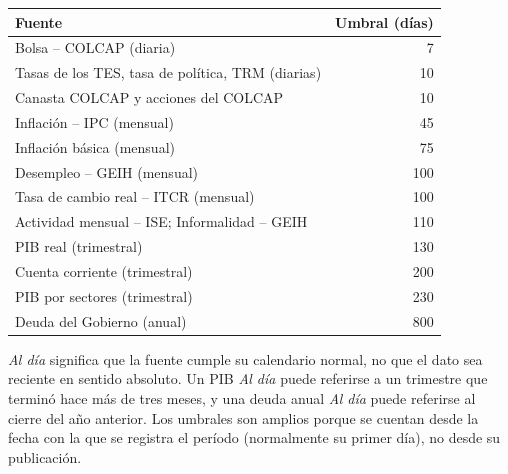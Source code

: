 \begin{center}\small
\begin{tabular}{@{}lr@{}}
\toprule
\textbf{Fuente} & \textbf{Umbral (días)}\\\midrule
Bolsa -- COLCAP (diaria) & 7\\
Tasas de los TES, tasa de política, TRM (diarias) & 10\\
Canasta COLCAP y acciones del COLCAP & 10\\
Inflación -- IPC (mensual) & 45\\
Inflación básica (mensual) & 75\\
Desempleo -- GEIH (mensual) & 100\\
Tasa de cambio real -- ITCR (mensual) & 100\\
Actividad mensual -- ISE; Informalidad -- GEIH & 110\\
PIB real (trimestral) & 130\\
Cuenta corriente (trimestral) & 200\\
PIB por sectores (trimestral) & 230\\
Deuda del Gobierno (anual) & 800\\
\bottomrule
\end{tabular}
\end{center}

\begin{alerta}
\emph{Al día} significa que la fuente cumple su calendario normal, no que el dato sea reciente en sentido
absoluto. Un PIB \emph{Al día} puede referirse a un trimestre que terminó hace más de tres meses, y una deuda
anual \emph{Al día} puede referirse al cierre del año anterior. Los umbrales son amplios porque se cuentan
desde la fecha con la que se registra el período (normalmente su primer día), no desde su publicación.
\end{alerta}
